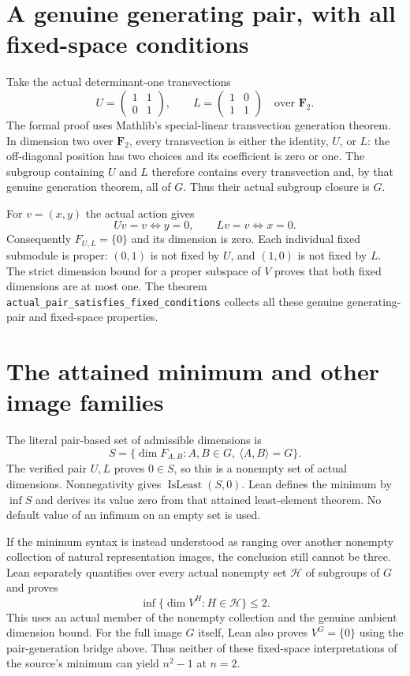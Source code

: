 \documentclass[11pt]{article}
\begin{document}
\newpage
\section{A genuine generating pair, with all fixed-space conditions}
Take the actual determinant-one transvections
\[
 U=\begin{pmatrix}1&1\\0&1\end{pmatrix},\qquad
 L=\begin{pmatrix}1&0\\1&1\end{pmatrix}
 \quad\text{over }\mathbf F_2.
\]
The formal proof uses Mathlib's special-linear transvection
generation theorem. In dimension two over $\mathbf F_2$, every
transvection is either the identity, $U$, or $L$: the off-diagonal
position has two choices and its coefficient is zero or one.
The subgroup containing $U$ and $L$ therefore contains every
transvection and, by that genuine generation theorem, all of $G$.
Thus their actual subgroup closure is $G$.

For $v=(x,y)$ the actual action gives
\[
 Uv=v\iff y=0,\qquad Lv=v\iff x=0.
\]
Consequently $F_{U,L}=\{0\}$ and its dimension is zero. Each
individual fixed submodule is proper: $(0,1)$ is not fixed by $U$,
and $(1,0)$ is not fixed by $L$. The strict dimension bound for a
proper subspace of $V$ proves that both fixed dimensions are at most
one. The theorem \texttt{actual\_pair\_satisfies\_fixed\_conditions}
collects all these genuine generating-pair and fixed-space properties.

\section{The attained minimum and other image families}
The literal pair-based set of admissible dimensions is
\[
 S=\{\dim F_{A,B}: A,B\in G,\ \langle A,B\rangle=G\}.
\]
The verified pair $U,L$ proves $0\in S$, so this is a nonempty set
of actual dimensions. Nonnegativity gives $\operatorname{IsLeast}(S,0)$.
Lean defines the minimum by $\inf S$ and derives its value zero from
that attained least-element theorem. No default value of an infimum
on an empty set is used.

If the minimum syntax is instead understood as ranging over another
nonempty collection of natural representation images, the conclusion
still cannot be three. Lean separately quantifies over every actual
nonempty set $\mathcal H$ of subgroups of $G$ and proves
\[
 \inf\{\dim V^H:H\in\mathcal H\}\le2.
\]
This uses an actual member of the nonempty collection and the genuine
ambient dimension bound. For the full image $G$ itself, Lean also
proves $V^G=\{0\}$ using the pair-generation bridge above.
Thus neither of these fixed-space interpretations of the source's
minimum can yield $n^2-1$ at $n=2$.
\end{document}
